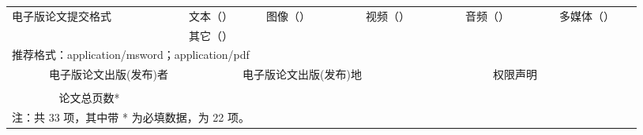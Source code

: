 \documentclass[a4paper,12pt,oneside,openany]{book}
\begin{document}
\begin{table}[tbph]
\begin{tabular}{|ccccccccccc|c|ccc|cc|c||c|c||c||c||c|c|cccc|cc|c|ccccc|cc|c|cccc|cc|ccc|c|ccc|cccc|cccc|}
\hline 
\multicolumn{15}{|l}{电子版论文提交格式} &  & \multicolumn{8}{c}{文本（\quad{}）} & \multicolumn{9}{c}{图像（\quad{}）} & \multicolumn{9}{c}{视频（\quad{}）} & \multicolumn{9}{c}{音频（\quad{}）} & \multicolumn{9}{c|}{多媒体（\quad{}）}\tabularnewline
 &  &  &  &  &  &  &  &  &  & \multicolumn{1}{c}{} & \multicolumn{1}{c}{} &  &  & \multicolumn{1}{c}{} &  & \multicolumn{8}{c}{其它（\quad{}）} &  &  &  & \multicolumn{1}{c}{} &  & \multicolumn{1}{c}{} & \multicolumn{1}{c}{} &  &  &  &  & \multicolumn{1}{c}{} &  & \multicolumn{1}{c}{} & \multicolumn{1}{c}{} &  &  &  & \multicolumn{1}{c}{} &  & \multicolumn{1}{c}{} &  &  & \multicolumn{1}{c}{} & \multicolumn{1}{c}{} &  &  & \multicolumn{1}{c}{} &  &  &  & \multicolumn{1}{c}{} &  &  &  & \tabularnewline
\multicolumn{60}{|l|}{推荐格式：application/msword；application/pdf }\tabularnewline
\hline 
\multicolumn{19}{|c|}{电子版论文出版(发布)者} & \multicolumn{19}{c|}{电子版论文出版(发布)地} & \multicolumn{22}{c|}{权限声明}\tabularnewline
\hline 
\multicolumn{19}{|c|}{} & \multicolumn{19}{c|}{} & \multicolumn{22}{c|}{}\tabularnewline
\hline 
\multicolumn{15}{|c|}{论文总页数{*}} & \multicolumn{45}{c|}{}\tabularnewline
\hline 
\multicolumn{60}{|l|}{注：共 33 项，其中带 {*} 为必填数据，为 22 项。}\tabularnewline
\hline 
\end{tabular}
\end{table}

 
 
\clearpage 
\end{document}

